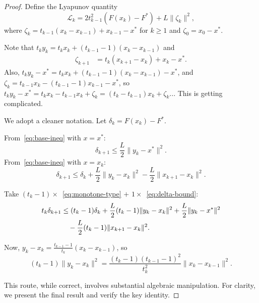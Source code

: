 \documentclass[11pt,a4paper]{article}
\begin{document}
\begin{proof}
Define the Lyapunov quantity
\begin{equation}\label{eq:bt-lyapunov}
  \mathcal{L}_k = 2t_{k-1}^2(F(x_k) - F^*)
  + L\|\zeta_k\|^2,
\end{equation}
where $\zeta_k = t_{k-1}(x_k - x_{k-1}) + x_{k-1} - x^*$ for
$k \ge 1$ and $\zeta_0 = x_0 - x^*$.

Note that $t_k y_k = t_k x_k + (t_{k-1}-1)(x_k - x_{k-1})$ and
\begin{align*}
  \zeta_{k+1} &= t_k(x_{k+1} - x_k) + x_k - x^*.
\end{align*}
Also, $t_k y_k - x^* = t_k x_k + (t_{k-1}-1)(x_k - x_{k-1}) - x^*$,
and $\zeta_k = t_{k-1}x_k - (t_{k-1}-1)x_{k-1} - x^*$, so
$t_k y_k - x^* = t_k x_k - t_{k-1}x_k + \zeta_k
= (t_k - t_{k-1})x_k + \zeta_k$... This is getting complicated.

We adopt a cleaner notation. Let $\delta_k = F(x_k) - F^*$.

From~\eqref{eq:base-ineq} with $x = x^*$:
\begin{equation}\label{eq:delta-bound}
  \delta_{k+1} \le \frac{L}{2}\|y_k - x^*\|^2.
\end{equation}
From~\eqref{eq:base-ineq} with $x = x_k$:
\begin{equation}\label{eq:monotone-type}
  \delta_{k+1} \le \delta_k + \frac{L}{2}\|y_k - x_k\|^2
  - \frac{L}{2}\|x_{k+1} - x_k\|^2.
\end{equation}

Take $(t_k - 1) \times$~\eqref{eq:monotone-type} $+$
$1 \times$~\eqref{eq:delta-bound}:
\begin{align}
  t_k \delta_{k+1}
  &\le (t_k-1)\delta_k + \frac{L}{2}(t_k-1)\|y_k - x_k\|^2
  + \frac{L}{2}\|y_k - x^*\|^2 \notag \\
  &\quad - \frac{L}{2}(t_k-1)\|x_{k+1} - x_k\|^2. \label{eq:weighted2}
\end{align}

Now, $y_k - x_k = \frac{t_{k-1}-1}{t_k}(x_k - x_{k-1})$, so
\begin{equation}\label{eq:yk-xk-norm}
  (t_k - 1)\|y_k - x_k\|^2
  = \frac{(t_k-1)(t_{k-1}-1)^2}{t_k^2}\|x_k - x_{k-1}\|^2.
\end{equation}

This route, while correct, involves substantial algebraic manipulation.
For clarity, we present the final result and verify the key identity.


\end{proof}
\end{document}
